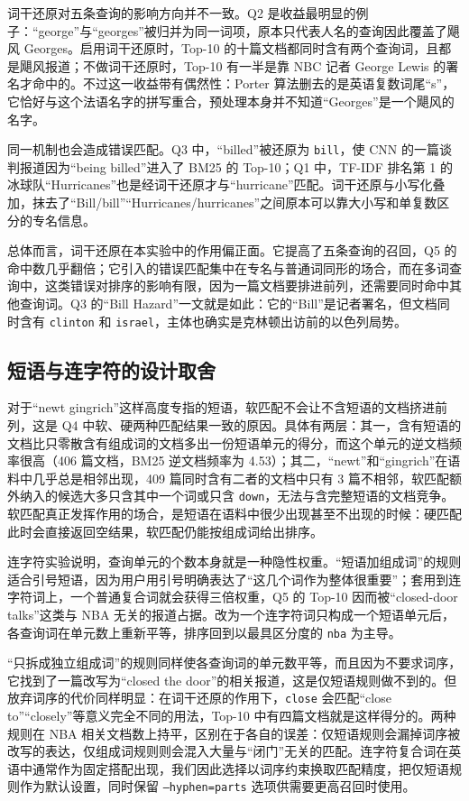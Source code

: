 \documentclass[12pt,a4paper]{ctexart}
\begin{document}
词干还原对五条查询的影响方向并不一致。Q2 是收益最明显的例子：“george”与“georges”被归并为同一词项，原本只代表人名的查询因此覆盖了飓风 Georges。启用词干还原时，Top-10 的十篇文档都同时含有两个查询词，且都是飓风报道；不做词干还原时，Top-10 有一半是靠 NBC 记者 George Lewis 的署名才命中的。不过这一收益带有偶然性：Porter 算法删去的是英语复数词尾“s”，它恰好与这个法语名字的拼写重合，预处理本身并不知道“Georges”是一个飓风的名字。

同一机制也会造成错误匹配。Q3 中，“billed”被还原为 \texttt{bill}，使 CNN 的一篇谈判报道因为“being billed”进入了 BM25 的 Top-10；Q1 中，TF-IDF 排名第 1 的冰球队“Hurricanes”也是经词干还原才与“hurricane”匹配。词干还原与小写化叠加，抹去了“Bill/bill”“Hurricanes/hurricanes”之间原本可以靠大小写和单复数区分的专名信息。

总体而言，词干还原在本实验中的作用偏正面。它提高了五条查询的召回，Q5 的命中数几乎翻倍；它引入的错误匹配集中在专名与普通词同形的场合，而在多词查询中，这类错误对排序的影响有限，因为一篇文档要排进前列，还需要同时命中其他查询词。Q3 的“Bill Hazard”一文就是如此：它的“Bill”是记者署名，但文档同时含有 \texttt{clinton} 和 \texttt{israel}，主体也确实是克林顿出访前的以色列局势。

\subsection{短语与连字符的设计取舍}

对于“newt gingrich”这样高度专指的短语，软匹配不会让不含短语的文档挤进前列，这是 Q4 中软、硬两种匹配结果一致的原因。具体有两层：其一，含有短语的文档比只零散含有组成词的文档多出一份短语单元的得分，而这个单元的逆文档频率很高（406 篇文档，BM25 逆文档频率为 4.53）；其二，“newt”和“gingrich”在语料中几乎总是相邻出现，409 篇同时含有二者的文档中只有 3 篇不相邻，软匹配额外纳入的候选大多只含其中一个词或只含 \texttt{down}，无法与含完整短语的文档竞争。软匹配真正发挥作用的场合，是短语在语料中很少出现甚至不出现的时候：硬匹配此时会直接返回空结果，软匹配仍能按组成词给出排序。

连字符实验说明，查询单元的个数本身就是一种隐性权重。“短语加组成词”的规则适合引号短语，因为用户用引号明确表达了“这几个词作为整体很重要”；套用到连字符词上，一个普通复合词就会获得三倍权重，Q5 的 Top-10 因而被“closed-door talks”这类与 NBA 无关的报道占据。改为一个连字符词只构成一个短语单元后，各查询词在单元数上重新平等，排序回到以最具区分度的 \texttt{nba} 为主导。

“只拆成独立组成词”的规则同样使各查询词的单元数平等，而且因为不要求词序，它找到了一篇改写为“closed the door”的相关报道，这是仅短语规则做不到的。但放弃词序的代价同样明显：在词干还原的作用下，\texttt{close} 会匹配“close to”“closely”等意义完全不同的用法，Top-10 中有四篇文档就是这样得分的。两种规则在 NBA 相关文档数上持平，区别在于各自的误差：仅短语规则会漏掉词序被改写的表达，仅组成词规则则会混入大量与“闭门”无关的匹配。连字符复合词在英语中通常作为固定搭配出现，我们因此选择以词序约束换取匹配精度，把仅短语规则作为默认设置，同时保留 \texttt{--hyphen=parts} 选项供需要更高召回时使用。
\end{document}
